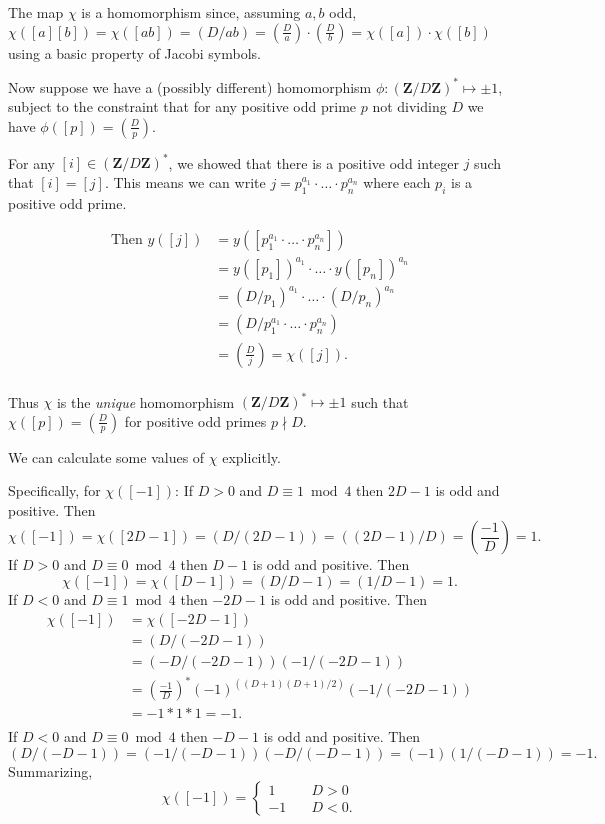 \documentclass[b5paper,12pt,oneside,openright]{memoir}
\begin{document}
The map $\chi$ is a homomorphism since, assuming $a,b$ odd, $\chi([a][b]) = \chi([ab]) = (D/ab) = (\frac{D}{a})\cdot(\frac{D}{b}) = \chi([a])\cdot\chi([b])$ using a basic property of Jacobi symbols.

Now suppose we have a (possibly different) homomorphism
$\phi:(\mathbf{Z}/D\mathbf{Z})^* \mapsto {\pm 1}$, subject to the constraint that for any positive odd prime $p$ not dividing $D$ we have
  $\phi([p]) = (\frac{D}{p})$.

For any $[i]\in (\mathbf{Z}/D\mathbf{Z})^*$, we showed that there is a positive odd integer $j$ such that $[i] = [j]$. This means we can write $j=p_1^{a_1}\cdot\ldots\cdot p_n^{a_n}$ where each $p_i$ is a positive odd prime.

\begin{align*}
\textrm{Then }
  y([j]) &= y([p_1^{a_1}\cdot\ldots\cdot p_n^{a_n}])\\
         &= y([p_1])^{a_1}\cdot\ldots\cdot y([p_n])^{a_n}\\
         &= (D/p_1)^{a_1}\cdot\ldots\cdot (D/p_n)^{a_n}\\
         &= (D/p_1^{a_1}\cdot\ldots\cdot p_n^{a_n})\\
         &= (\frac{D}{j}) = \chi([j]).\\
\end{align*}

Thus $\chi$ is the \emph{unique} homomorphism $(\mathbf{Z}/D\mathbf{Z})^* \mapsto {\pm 1}$ such that $\chi([p]) = (\frac{D}{p})$ for positive odd primes $p\nmid D$.

We can calculate some values of $\chi$ explicitly.

Specifically, for $\chi([-1])$:
If $D>0$ and $D\equiv 1\bmod 4$ then $2D-1$ is odd and positive. Then
  \[\chi([-1]) = \chi([2D-1]) = (D/(2D-1)) = ((2D-1)/D) = (\frac{-1}{D}) = 1.\]
If $D>0$ and $D\equiv 0\bmod 4$ then $D-1$ is odd and positive. Then
  \[\chi([-1]) = \chi([D-1]) = (D/D-1) = (1/D-1) = 1.\]
If $D<0$ and $D\equiv 1\bmod 4$ then $-2D-1$ is odd and positive. Then
\begin{align*}
  \chi([-1]) &= \chi([-2D-1])\\
             &= (D/(-2D-1))\\
             &= (-D/(-2D-1))(-1/(-2D-1))\\
             &= (\frac{-1}{D})^*(-1)^((D+1)(D+1)/2) (-1/(-2D-1))\\
             &= -1 * 1 * 1 = -1.\\
\end{align*}
If $D<0$ and $D\equiv 0\bmod 4$ then $-D-1$ is odd and positive. Then
  \[(D/(-D-1)) = (-1/(-D-1))(-D/(-D-1)) = (-1)(1/(-D-1)) = -1.\]
Summarizing,
\[\chi([-1]) =
  \begin{cases}
    1&\quad D>0\\
    -1&\quad D<0.
  \end{cases}
\]
\end{document}
